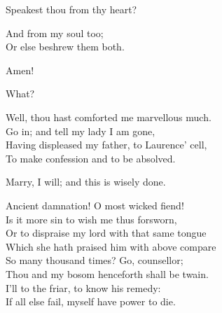 \begin{speech}
Speakest thou from thy heart? \\
\end{speech}
\begin{speech}
And from my soul too; \\
Or else beshrew them both. \\
\end{speech}
\begin{speech}
Amen! \\
\end{speech}
\begin{speech}
What? \\
\end{speech}
\begin{speech}
Well, thou hast comforted me marvellous much. \\
Go in; and tell my lady I am gone, \\
Having displeased my father, to Laurence' cell, \\
To make confession and to be absolved. \\
\end{speech}
\begin{speech}
Marry, I will; and this is wisely done.  \\
\end{speech}
\begin{speech}
Ancient damnation!   O most wicked fiend! \\
Is it more sin to wish me thus forsworn, \\
Or to dispraise my lord with that same tongue \\
Which she hath praised him with above compare \\
So many thousand times?   Go, counsellor; \\
Thou   and my bosom henceforth shall be twain. \\
I'll to the friar, to know his remedy: \\
If all else fail, myself have power to die.  \\

\end{speech}




